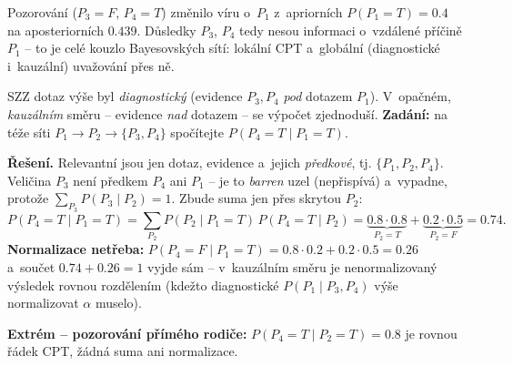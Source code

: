 \begin{poznamka}
Pozorování ($P_3{=}F$, $P_4{=}T$) změnilo víru o~$P_1$ z~apriorních $P(P_1{=}T)=0.4$ na aposteriorních $0.439$. Důsledky $P_3$, $P_4$ tedy nesou informaci o~vzdálené příčině $P_1$ -- to je celé kouzlo Bayesovských sítí: lokální CPT a~globální (diagnostické i~kauzální) uvažování přes ně.
\end{poznamka}

\begin{priklad}
SZZ dotaz výše byl \emph{diagnostický} (evidence $P_3,P_4$ \emph{pod} dotazem $P_1$). V~opačném, \emph{kauzálním} směru -- evidence \emph{nad} dotazem -- se výpočet zjednoduší. \textbf{Zadání:} na téže síti $P_1\to P_2\to\{P_3,P_4\}$ spočítejte $P(P_4{=}T\mid P_1{=}T)$.

\textbf{Řešení.} Relevantní jsou jen dotaz, evidence a~jejich \emph{předkové}, tj. $\{P_1,P_2,P_4\}$. Veličina $P_3$ není předkem $P_4$ ani $P_1$ -- je to \emph{barren} uzel (nepřispívá) a~vypadne, protože $\sum_{P_3} P(P_3\mid P_2)=1$. Zbude suma jen přes skrytou $P_2$:
\[
P(P_4{=}T\mid P_1{=}T)=\sum_{P_2} P(P_2\mid P_1{=}T)\,P(P_4{=}T\mid P_2)
= \underbrace{0.8\cdot0.8}_{P_2{=}T} + \underbrace{0.2\cdot0.5}_{P_2{=}F} = 0.74.
\]
\textbf{Normalizace netřeba:} $P(P_4{=}F\mid P_1{=}T)=0.8\cdot0.2+0.2\cdot0.5=0.26$ a~součet $0.74+0.26=1$ vyjde sám -- v~kauzálním směru je nenormalizovaný výsledek rovnou rozdělením (kdežto diagnostické $P(P_1\mid P_3,P_4)$ výše normalizovat $\alpha$ muselo).

\textbf{Extrém -- pozorování přímého rodiče:} $P(P_4{=}T\mid P_2{=}T)=0.8$ je rovnou řádek CPT, žádná suma ani normalizace.
\end{priklad}
